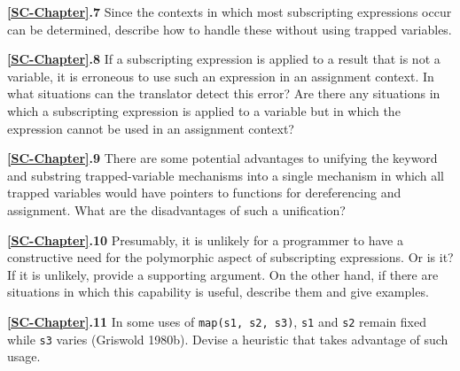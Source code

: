 \noindent\textbf{\ref*{SC-Chapter}.7}
Since the contexts in which most subscripting
expressions occur can be determined, describe how to handle these
without using trapped variables.

\noindent\textbf{\ref*{SC-Chapter}.8}
If a subscripting expression is applied to a
result that is not a variable, it is erroneous to use such an
expression in an assignment context. In what situations can the
translator detect this error? Are there any situations in which a
subscripting expression is applied to a variable but in which the
expression cannot be used in an assignment context?

\noindent\textbf{\ref*{SC-Chapter}.9}
There are some potential advantages to unifying
the keyword and substring trapped-variable mechanisms into a single
mechanism in which all trapped variables would have pointers to
functions for dereferencing and assignment. What are the disadvantages
of such a unification?

\noindent\textbf{\ref*{SC-Chapter}.10}
Presumably, it is unlikely for a programmer to
have a constructive need for the polymorphic aspect of subscripting
expressions. Or is it? If it is unlikely, provide a supporting
argument. On the other hand, if there are situations in which this
capability is useful, describe them and give examples.

\noindent\textbf{\ref*{SC-Chapter}.11}
In some uses of \texttt{map(s1, s2, s3)}, \texttt{s1}
and \texttt{s2} remain fixed while \texttt{s3} varies (Griswold
1980b). Devise a heuristic that takes advantage of such usage.
